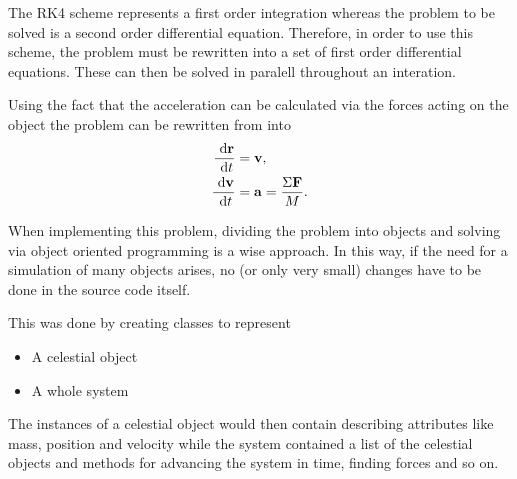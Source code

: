 The RK4 scheme represents a first order integration whereas the
problem to be solved is a second order differential equation.
Therefore, in order to use this scheme, the problem must be
rewritten into a set of first order differential equations. These
can then be solved in paralell throughout an interation.

Using the fact that the acceleration can be calculated via the
forces acting on the object the problem can be rewritten from
 into
\begin{align}
    \frac{\ \mathrm{d}\mathbf{r}}{\ \mathrm{d}t} &= \mathbf{v}, \label{diffSetFirstR} \\
    \frac{\ \mathrm{d}\mathbf{v}}{\ \mathrm{d}t} &= \mathbf{a} = \frac{\Sigma
        \mathbf{F}}{M}.
    \label{diffSetFirstV}
\end{align}

When implementing this problem, dividing the problem into objects
and solving via object oriented programming is a wise approach. In
this way, if the need for a simulation of many objects arises, no
(or only very small) changes have to be done in the source code
itself.

This was done by creating classes to represent
\begin{itemize}
    \item A celestial object
    \item A whole system
\end{itemize}
The instances of a celestial object would then contain describing
attributes like mass, position and velocity while the system
contained a list of the celestial objects and methods for advancing
the system in time, finding forces and so on.
